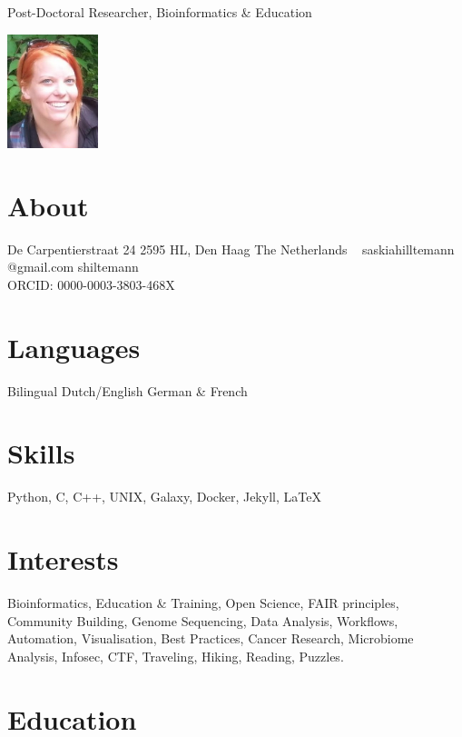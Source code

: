 \documentclass[]{shiltemann-cv}
\begin{document}
       {Post-Doctoral Researcher, Bioinformatics \& Education}


\begin{aside}
  \includegraphics[width=75pt]{foto.jpg}
  \section{About}
    De Carpentierstraat 24
    2595 HL, Den Haag
    The Netherlands
    ~
    saskiahilltemann @gmail.com \faEnvelope
    shiltemann \faGithub \ \faTwitter \ \faLinkedin
    \
    \ \\
    ORCID:
    0000-0003-3803-468X \faOrcid
  \section{Languages}
    Bilingual Dutch/English
    German \& French
  \section{Skills}
    Python, C, C++, UNIX, Galaxy, Docker, Jekyll, LaTeX
\end{aside}

\section{Interests}

Bioinformatics, Education \& Training, Open Science, FAIR principles, Community Building, Genome Sequencing, Data Analysis, Workflows, Automation, Visualisation, Best Practices, Cancer Research, Microbiome Analysis, Infosec, CTF, Traveling, Hiking, Reading, Puzzles.

\section{Education}
\end{document}
